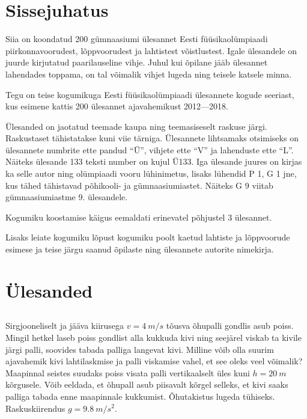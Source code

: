 \documentclass[10pt]{article}
\begin{document}
{\setlength{\parindent}{24pt}
\section{Sissejuhatus}

Siia on koondatud 200 gümnaasiumi ülesannet Eesti füüsikaolümpiaadi piirkonnavoorudest, lõppvoorudest ja lahtistest võistlustest. Igale ülesandele on juurde kirjutatud paarilauseline vihje. Juhul kui õpilane jääb ülesannet lahendades toppama, on tal võimalik vihjet lugeda ning teisele katsele minna.

Tegu on teise kogumikuga Eesti füüsikaolümpiaadi ülesannete kogude seeriast, kus esimene kattis 200 ülesannet ajavahemikust 2012---2018.

Ülesanded on jaotatud teemade kaupa ning teemasiseselt raskuse järgi. Raskustaset tähistatakse kuni viie tärniga. Ülesannete lihtsamaks otsimiseks on ülesannete numbrite ette pandud \enquote{Ü}, vihjete ette \enquote{V} ja lahenduste ette \enquote{L}. Näiteks ülesande 133 teksti number on kujul Ü133. Iga ülesande juures on kirjas ka selle autor ning olümpiaadi vooru lühinimetus, lisaks lühendid P 1, G 1 jne, kus tähed tähistavad põhikooli- ja gümnaasiumiastet. Näiteks G 9 viitab gümnaasiumiastme 9. ülesandele.

Kogumiku koostamise käigus eemaldati erinevatel põhjustel 3 ülesannet.

Lisaks leiate kogumiku lõpust kogumiku poolt kaetud lahtiste ja lõppvoorude esimese ja teise järgu saanud õpilaste ning ülesannete autorite nimekirja.
\newpage
\setlength{\parindent}{0pt}

        \section{Ülesanded}
        \toggleStatement
        \subsection{\protect{}}

\graphicspath{{../problems/}}


Sirgjooneliselt ja jääva kiirusega $v = \SI{4}{m/s}$ tõusva õhupalli gondlis asub poiss. Mingil hetkel laseb poiss gondlist alla kukkuda kivi ning seejärel viskab ta kivile järgi palli, soovides tabada palliga langevat kivi. Milline võib olla suurim ajavahemik kivi lahtilaskmise ja palli viskamise vahel, et see oleks veel võimalik? Maapinnal seistes suudaks poiss visata palli vertikaalselt üles kuni $h = \SI{20}{m}$ kõrgusele. Võib eeldada, et õhupall asub piisavalt kõrgel selleks, et kivi saaks palliga tabada enne maapinnale kukkumist. Õhutakistus lugeda tühiseks. Raskuskiirendus $g = \SI{9,8}{m/s^2}$.
\probend
\bigskip

}
\end{document}

